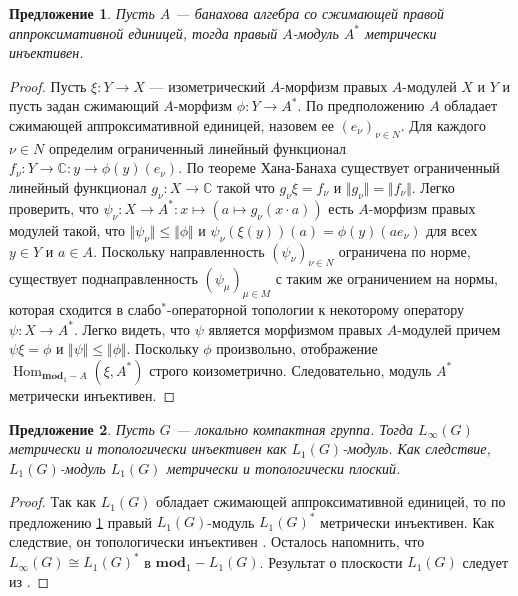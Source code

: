 \documentclass{article}
\numberwithin{equation}{section}
\theoremstyle{plain}
\newtheorem{propos}{Предложение}
\theoremstyle{definition}
\newtheorem{proof}{Доказательство}\def\theproof{}
\newcommand{\isom}{\mathop{\mathbin{\cong}}}
\begin{document}
\begin{fulltext}
\begin{propos}\label{AlgDualWithApproxIdIsMetrInj} Пусть $A$ --- банахова алгебра 
со сжимающей правой аппроксимативной единицей, тогда правый $A$-модуль $A^*$ 
метрически инъективен. 
\end{propos}
\begin{proof} Пусть $\xi:Y\to X$ --- изометрический $A$-морфизм правых $A$-модулей 
$X$ и $Y$ и пусть задан сжимающий $A$-морфизм $\phi: Y\to A^*$. По предположению 
$A$ обладает сжимающей аппроксимативной единицей, назовем ее $(e_\nu)_{\nu\in N}$. 
Для каждого $\nu\in N$ определим ограниченный линейный функционал
$f_\nu:Y\to\mathbb{C}:y\to \phi(y)(e_\nu)$. По теореме Хана-Банаха существует 
ограниченный линейный функционал $g_\nu:X\to\mathbb{C}$ такой что $g_\nu\xi=f_\nu$ 
и $\Vert g_\nu\Vert=\Vert f_\nu\Vert$. Легко проверить, что 
$\psi_\nu: X\to A^*:x\mapsto(a\mapsto g_\nu(x\cdot a))$ есть $A$-морфизм правых 
модулей такой, что $\Vert\psi_\nu\Vert\leq\Vert\phi\Vert$ и 
$\psi_\nu(\xi(y))(a)=\phi(y)(a e_\nu)$ для всех $y\in Y$ и $a\in A$. Поскольку 
направленность $(\psi_\nu)_{\nu\in N}$ ограничена по норме, существует
поднаправленность $(\psi_\mu)_{\mu\in M}$ с таким же ограничением на нормы, которая 
сходится в слабо${}^*$-операторной топологии к некоторому оператору $\psi:X\to A^*$.
Легко видеть, что $\psi$ является морфизмом правых $A$-модулей причем $\psi\xi=\phi$ и $\Vert\psi\Vert\leq\Vert\phi\Vert$. Поскольку $\phi$ произвольно, отображение $\operatorname{Hom}_{\mathbf{mod}_1-A}(\xi, A^*)$ строго коизометрично. 
Следовательно, модуль $A^*$ метрически инъективен.
\end{proof}

\begin{propos}\label{LInfIsL1MetrInj} Пусть $G$ --- локально компактная группа.
Тогда $L_\infty(G)$ метрически и топологически инъективен как $L_1(G)$-модуль. 
Как следствие, $L_1(G)$-модуль $L_1(G)$ метрически и топологически плоский.
\end{propos}
\begin{proof} Так как $L_1(G)$ обладает сжимающей аппроксимативной единицей, то 
по предложению \ref{AlgDualWithApproxIdIsMetrInj} правый $L_1(G)$-модуль 
$L_1(G)^*$ метрически инъективен. Как следствие, он топологически инъективен 
\cite[предложение~2.14]{NemGeomProjInjFlatBanMod}. Осталось напомнить, что 
$L_\infty(G)\isom L_1(G)^*$ в $\mathbf{mod}_1-L_1(G)$. Результат о плоскости 
$L_1(G)$ следует из \cite[предложение~2.21]{NemGeomProjInjFlatBanMod}.
\end{proof}


\end{fulltext}
\end{document}
